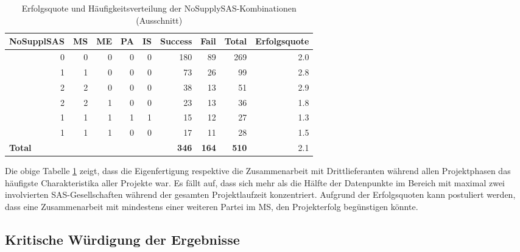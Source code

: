 \begin{table}[H]
	\centering
	\caption{Erfolgsquote und Häufigkeitsverteilung der NoSupplySAS-Kombinationen (Ausschnitt)}
	\begin{tabular}{lrrrrrrrr}
		\textbf{NoSupplSAS} & \multicolumn{1}{l}{\textbf{MS}} & \multicolumn{1}{l}{\textbf{ME}} & \multicolumn{1}{l}{\textbf{PA}} & \multicolumn{1}{l}{\textbf{IS}} & \multicolumn{1}{l}{\textbf{Success}} & \multicolumn{1}{l}{\textbf{Fail}} & \multicolumn{1}{l}{\textbf{Total}} & \multicolumn{1}{l}{\textbf{Erfolgsquote}} \\ \hline
		\multicolumn{1}{r}{0} & 0     & 0     & 0     & 0     & 180   & 89    & 269 & 2.0 \\
		\multicolumn{1}{r}{1} & 1     & 0     & 0     & 0     & 73    & 26    & 99  & 2.8 \\
		\multicolumn{1}{r}{2} & 2     & 0     & 0     & 0     & 38    & 13    & 51  & 2.9 \\
		\multicolumn{1}{r}{2} & 2     & 1     & 0     & 0     & 23    & 13    & 36  & 1.8 \\
		\multicolumn{1}{r}{1} & 1     & 1     & 1     & 1     & 15    & 12    & 27  & 1.3 \\
		\multicolumn{1}{r}{1} & 1     & 1     & 0     & 0     & 17    & 11    & 28  & 1.5 \\ \hline
		\textbf{Total} &       &       &       &       & \textbf{346} & \textbf{164} & \textbf{510} & 2.1 \\
	\end{tabular}%
	\label{fnosas}%
\end{table}%
Die obige Tabelle \ref{fnosas} zeigt, dass die Eigenfertigung respektive die Zusammenarbeit mit Drittlieferanten während allen Projektphasen das häufigste Charakteristika aller Projekte war. Es fällt auf, dass sich mehr als die Hälfte der Datenpunkte im Bereich mit maximal zwei involvierten SAS-Gesellschaften während der gesamten Projektlaufzeit konzentriert. Aufgrund der Erfolgsquoten kann postuliert werden, dass eine Zusammenarbeit mit mindestens einer weiteren Partei im MS, den Projekterfolg begünstigen könnte.
\newpage
\subsection{Kritische Würdigung der Ergebnisse}
\newpage	
	


